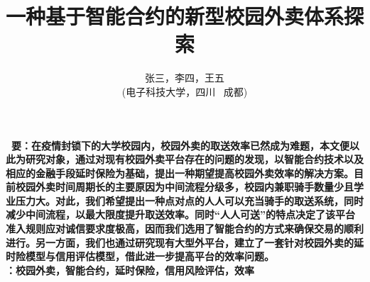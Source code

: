 \documentclass[UTF8]{ctexart}
\title{\textbf{一种基于智能合约的新型校园外卖体系探索}}
\author{\sffamily 张三，李四，王五\\ \sffamily(电子科技大学，四川 \ 成都)}
\date{}
\begin{document}
  \maketitle
  \textbf{ \ 要：\heiti  \small 在疫情封锁下的大学校园内，校园外卖的取送效率已然成为难题，本文便以此为研究对象，通过对现有校园外卖平台存在的问题的发现，以智能合约技术以及相应的金融手段延时保险为基础，提出一种期望提高校园外卖效率的解决方案。目前校园外卖时间周期长的主要原因为中间流程分级多，校园内兼职骑手数量少且学业压力大。对此，我们希望提出一种点对点的人人可以充当骑手的取送系统，同时减少中间流程，以最大限度提升取送效率。同时“人人可送”的特点决定了该平台准入规则应对诚信要求度极高，因而我们选用了智能合约的方式来确保交易的顺利进行。另一方面，我们也通过研究现有大型外平台，建立了一套针对校园外卖的延时险模型与信用评估模型，借此进一步提高平台的效率问题。}
  \\
  \indent \textbf{：\heiti  \small 校园外卖，智能合约，延时保险，信用风险评估，效率}
  \pagestyle{plain}	%
\end{document}
